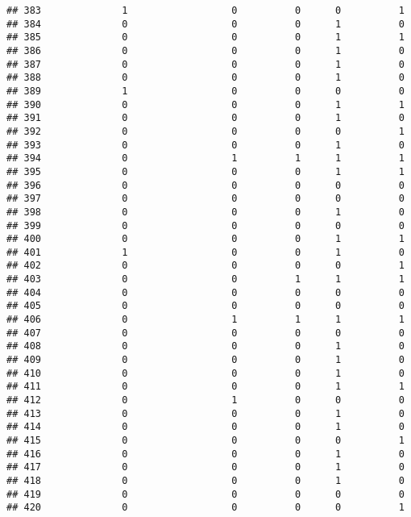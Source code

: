 \documentclass[
]{article}
\begin{document}
\begin{verbatim}
## 383              1                  0          0      0          1
## 384              0                  0          0      1          0
## 385              0                  0          0      1          1
## 386              0                  0          0      1          0
## 387              0                  0          0      1          0
## 388              0                  0          0      1          0
## 389              1                  0          0      0          0
## 390              0                  0          0      1          1
## 391              0                  0          0      1          0
## 392              0                  0          0      0          1
## 393              0                  0          0      1          0
## 394              0                  1          1      1          1
## 395              0                  0          0      1          1
## 396              0                  0          0      0          0
## 397              0                  0          0      0          0
## 398              0                  0          0      1          0
## 399              0                  0          0      0          0
## 400              0                  0          0      1          1
## 401              1                  0          0      1          0
## 402              0                  0          0      0          1
## 403              0                  0          1      1          1
## 404              0                  0          0      0          0
## 405              0                  0          0      0          0
## 406              0                  1          1      1          1
## 407              0                  0          0      0          0
## 408              0                  0          0      1          0
## 409              0                  0          0      1          0
## 410              0                  0          0      1          0
## 411              0                  0          0      1          1
## 412              0                  1          0      0          0
## 413              0                  0          0      1          0
## 414              0                  0          0      1          0
## 415              0                  0          0      0          1
## 416              0                  0          0      1          0
## 417              0                  0          0      1          0
## 418              0                  0          0      1          0
## 419              0                  0          0      0          0
## 420              0                  0          0      0          1

\end{verbatim}
\end{document}
